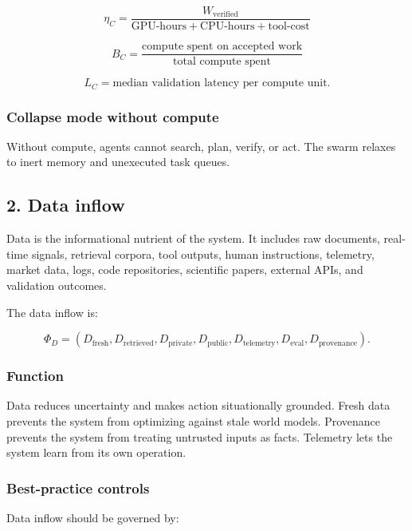 \documentclass[
  11pt,
]{article}
\begin{document}
\[
\eta_C=\frac{W_{\text{verified}}}{\text{GPU-hours}+\text{CPU-hours}+\text{tool-cost}}
\]

\[
B_C=\frac{\text{compute spent on accepted work}}{\text{total compute spent}}
\]

\[
L_C=\text{median validation latency per compute unit}.
\]

\subsubsection{Collapse mode without
compute}\label{collapse-mode-without-compute}

Without compute, agents cannot search, plan, verify, or act. The swarm
relaxes to inert memory and unexecuted task queues.

\subsection{2. Data inflow}\label{data-inflow}

Data is the informational nutrient of the system. It includes raw
documents, real-time signals, retrieval corpora, tool outputs, human
instructions, telemetry, market data, logs, code repositories,
scientific papers, external APIs, and validation outcomes.

The data inflow is:

\[
\Phi_D=(D_{\text{fresh}},D_{\text{retrieved}},D_{\text{private}},D_{\text{public}},D_{\text{telemetry}},D_{\text{eval}},D_{\text{provenance}}).
\]

\subsubsection{Function}\label{function-1}

Data reduces uncertainty and makes action situationally grounded. Fresh
data prevents the system from optimizing against stale world models.
Provenance prevents the system from treating untrusted inputs as facts.
Telemetry lets the system learn from its own operation.

\subsubsection{Best-practice controls}\label{best-practice-controls-1}

Data inflow should be governed by:
\end{document}
